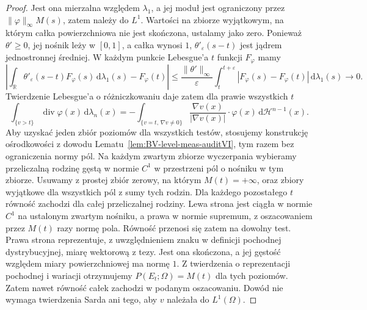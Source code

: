 \begin{proof}
Jest ona mierzalna względem $\lambda_1$,
a jej moduł jest ograniczony przez
$\|\varphi\|_\infty M(s)$, zatem należy do $L^1$.
Wartości na zbiorze wyjątkowym, na którym
całka powierzchniowa nie jest skończona,
ustalamy jako zero.
Ponieważ $\theta'\ge0$, jej nośnik leży
w $[0,1]$, a całka wynosi $1$,
$\theta'_\varepsilon(s-t)$ jest jądrem
jednostronnej średniej. W każdym punkcie
Lebesgue'a $t$ funkcji $F_\varphi$ mamy
\[
 \left|\int_{\mathbb R}\theta'_\varepsilon(s-t)
 F_\varphi(s)\,\mathrm d\lambda_1(s)-F_\varphi(t)\right|
 \le\frac{\|\theta'\|_\infty}{\varepsilon}
 \int_t^{t+\varepsilon}|F_\varphi(s)-F_\varphi(t)|
 \,\mathrm d\lambda_1(s)\longrightarrow0.
\]
Twierdzenie Lebesgue'a o różniczkowaniu daje
zatem dla prawie wszystkich $t$
\[
 \int_{\{v>t\}}\operatorname{div}\varphi(x)
 \,\mathrm d\lambda_n(x)
 =-\int_{\{v=t,\,\nabla v\ne0\}}
 \frac{\nabla v(x)}{|\nabla v(x)|}\cdot\varphi(x)
 \,\mathrm d\mathcal H^{n-1}(x).
\]
Aby uzyskać jeden zbiór poziomów dla wszystkich
testów, stosujemy konstrukcję ośrodkowości
z dowodu Lematu~\ref{lem:BV-level-meas-auditVI},
tym razem bez ograniczenia normy pól.
Na każdym zwartym zbiorze wyczerpania
wybieramy przeliczalną rodzinę gęstą w normie
$C^1$ w przestrzeni pól o nośniku w tym zbiorze.
Usuwamy z prostej zbiór zerowy, na którym
$M(t)=+\infty$, oraz zbiory wyjątkowe
dla wszystkich pól z sumy tych rodzin.
Dla każdego pozostałego $t$ równość zachodzi
dla całej przeliczalnej rodziny. Lewa strona
jest ciągła w normie $C^1$ na ustalonym
zwartym nośniku, a prawa w normie supremum,
z oszacowaniem przez $M(t)$ razy normę pola.
Równość przenosi się zatem na dowolny test.
Prawa strona reprezentuje, z uwzględnieniem
znaku w definicji pochodnej dystrybucyjnej,
miarę wektorową z tezy. Jest ona skończona,
a jej gęstość względem miary powierzchniowej
ma normę $1$. Z twierdzenia o reprezentacji
pochodnej i wariacji otrzymujemy
$P(E_t;\Omega)=M(t)$ dla tych poziomów.
Zatem nawet równość całek zachodzi w podanym
oszacowaniu. Dowód nie wymaga twierdzenia
Sarda ani tego, aby $v$ należała do $L^1(\Omega)$.
\end{proof}

